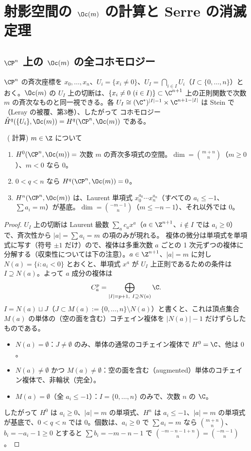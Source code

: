
\section{射影空間の $\Oc(m)$ の計算と Serre の消滅定理}\label{sec:serre}

\subsection{$\CP^n$ 上の $\Oc(m)$ の全コホモロジー}
$\CP^n$ の斉次座標を $x_0,\dots,x_n$、$U_i=\{x_i\ne0\}$、$U_I=\bigcap_{i\in I}U_i$（$I\subset\{0,\dots,n\}$）とおく。$\Oc(m)$ の $U_I$ 上の切断は、$\{x_i\ne0\ (i\in I)\}\subset\C^{n+1}$ 上の正則関数で次数 $m$ の斉次なものと同一視できる。各 $U_I\cong(\C^*)^{|I|-1}\times\C^{n+1-|I|}$ は Stein で（Leray の被覆、第3巻）、したがって \Cech{} コホモロジー $\check H^q(\{U_i\},\Oc(m))=H^q(\CP^n,\Oc(m))$ である。

\begin{thm}[$\CP^n$ の $\Oc(m)$ のコホモロジー]\label{thm:Pn}\tP\ (\Cech{} 計算)
$m\in\Z$ について
\begin{enumerate}
\item[(a)] $H^0(\CP^n,\Oc(m))=$ 次数 $m$ の斉次多項式の空間。$\dim=\binom{m+n}n$（$m\ge0$）、$m<0$ なら $0$。
\item[(b)] $0<q<n$ なら $H^q(\CP^n,\Oc(m))=0$。
\item[(c)] $H^n(\CP^n,\Oc(m))$ は、Laurent 単項式 $x_0^{a_0}\cdots x_n^{a_n}$（すべての $a_i\le-1$、$\sum a_i=m$）が基底。$\dim=\binom{-m-1}n$（$m\le-n-1$）、それ以外では $0$。
\end{enumerate}
\end{thm}
\begin{proof}
$U_I$ 上の切断は Laurent 級数 $\sum_ac_ax^a$（$a\in\Z^{n+1}$、$i\notin I$ では $a_i\ge0$）で、斉次性から $|a|=\sum a_i=m$ の項のみが現れる。\Cech{} 複体の微分は単項式を単項式に写す（符号 $\pm1$ だけ）ので、複体は多重次数 $a$ ごとの 1 次元ずつの複体に分解する（収束性については下の注意）。$a\in\Z^{n+1}$、$|a|=m$ に対し $N(a)=\{i:a_i<0\}$ とおくと、単項式 $x^a$ が $U_I$ 上正則であるための条件は $I\supseteq N(a)$。よって $a$ 成分の複体は
\[
C^p_a=\bigoplus_{|I|=p+1,\ I\supseteq N(a)}\C .
\]
$I=N(a)\sqcup J$（$J\subset M(a):=\{0,\dots,n\}\setminus N(a)$）と書くと、これは頂点集合 $M(a)$ の単体の（空の面を含む）コチェイン複体を $|N(a)|-1$ だけずらしたものである。
\begin{itemize}
\item $N(a)=\emptyset$：$J\ne\emptyset$ のみ、単体の通常のコチェイン複体で $H^0=\C$、他は $0$。
\item $N(a)\ne\emptyset$ かつ $M(a)\ne\emptyset$：空の面を含む（augmented）単体のコチェイン複体で、非輪状（完全）。
\item $M(a)=\emptyset$（全 $a_i\le-1$）：$I=\{0,\dots,n\}$ のみで、次数 $n$ の $\C$。
\end{itemize}
したがって $H^0$ は $a_i\ge0$、$|a|=m$ の単項式、$H^n$ は $a_i\le-1$、$|a|=m$ の単項式が基底で、$0<q<n$ では $0$。個数は、$a_i\ge0$ で $\sum a_i=m$ なら $\binom{m+n}n$、$b_i=-a_i-1\ge0$ とすると $\sum b_i=-m-n-1$ で $\binom{-m-n-1+n}n=\binom{-m-1}n$。
\end{proof}
